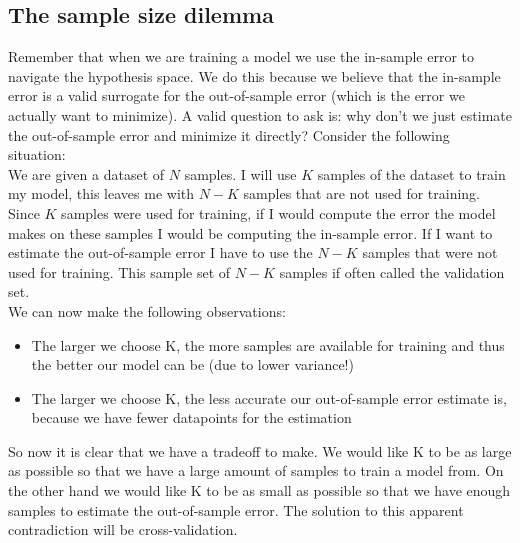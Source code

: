 \subsection{The sample size dilemma}
Remember that when we are training a model we use the in-sample error to navigate the hypothesis space. We do this because we believe that the in-sample error is a valid surrogate for the out-of-sample error (which is the error we actually want to minimize).
A valid question to ask is: why don't we just estimate the out-of-sample error and minimize it directly? Consider the following situation: \\
We are given a dataset of $N$ samples. I will use $K$ samples of the dataset to train my model, this leaves me with $N-K$ samples that are not used for training. Since $K$ samples were used for training, if I would compute the error the model makes on these samples I would be computing the in-sample error. If I want to estimate the out-of-sample error I have to use the $N-K$ samples that were not used for training. This sample set of $N-K$ samples if often called the validation set.\\
We can now make the following observations:
\begin{itemize}
	\item The larger we choose K, the more samples are available for training and thus the better our model can be (due to lower variance!)
	\item The larger we choose K, the less accurate our out-of-sample error estimate is, because we have fewer datapoints for the estimation
\end{itemize}
So now it is clear that we have a tradeoff to make. We would like K to be as large as possible so that we have a large amount of samples to train a model from. On the other hand we would like K to be as small as possible so that we have enough samples to estimate the out-of-sample error. The solution to this apparent contradiction will be cross-validation.
